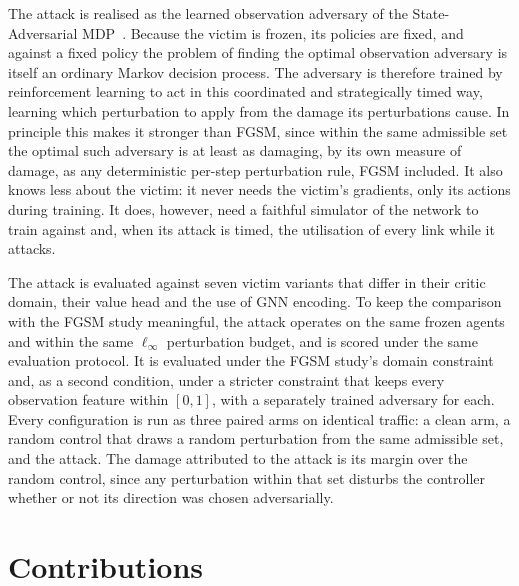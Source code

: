 The attack is realised as the learned observation adversary of the State-Adversarial
MDP~\cite{zhang2020robust}. Because the victim is frozen, its policies are fixed, and
against a fixed policy the problem of finding the optimal observation adversary is
itself an ordinary Markov decision process. The adversary is therefore trained by
reinforcement learning to act in this coordinated and strategically timed way, learning
which perturbation to apply from the damage its perturbations cause. In principle this
makes it stronger than FGSM, since within the same admissible set the optimal such
adversary is at least as damaging, by its own measure of damage, as any deterministic
per-step perturbation rule, FGSM included. It also knows less about the victim: it
never needs the victim's gradients, only its actions during training. It does, however,
need a faithful simulator of the network to train against and, when its attack is timed,
the utilisation of every link while it attacks.

The attack is evaluated against seven victim variants that differ in their critic
domain, their value head and the use of GNN encoding. To keep the comparison with the
FGSM study meaningful, the attack operates on the same frozen agents and within the
same $\ell_\infty$ perturbation budget, and is scored under the same evaluation
protocol. It is evaluated under the FGSM study's domain constraint and, as a second
condition, under a stricter constraint that keeps every observation feature within
$[0,1]$, with a separately trained adversary for each. Every configuration is run as
three paired arms on identical traffic: a clean arm, a random control that draws a
random perturbation from the same admissible set, and the attack. The damage attributed
to the attack is its margin over the random control, since any perturbation within
that set disturbs the controller whether or not its direction was chosen
adversarially.

\section{Contributions}
\label{sec:intro_contributions}

